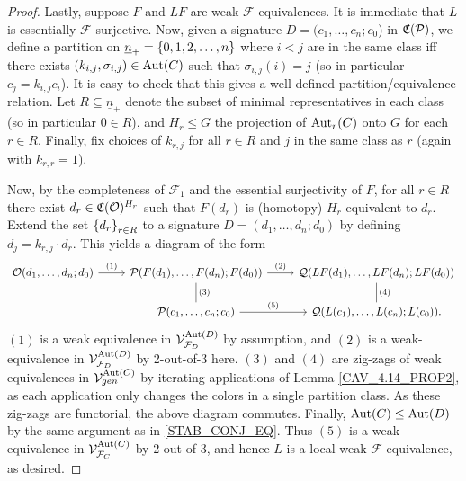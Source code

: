 \documentclass[a4paper,10pt
,draft
]{article}%
\renewcommand{\F}{\mathcal F}
\newcommand{\Q}{\mathcal Q}
\renewcommand{\1}{\eta}%
\begin{document}
\begin{proof}
      Lastly, suppose $F$ and $LF$ are weak $\F$-equivalences.
      It is immediate that $L$ is essentially $\F$-surjective.
      Now, given a signature $D = (c_1,\ldots,c_n;c_0$) in $\mathfrak C(\mathcal{P})$,
      we define a partition on $\underline{n}_+ = \left\{0,1,2,\dots,n\right\}$ where
      $i < j$ are in the same class iff there exists $(k_{i,j}, \sigma_{i,j}) \in \operatorname{Aut}(C)$ such that
      $\sigma_{i,j}(i) = j$ (so in particular $c_j = k_{i,j} c_i$).
      It is easy to check that this gives a well-defined partition/equivalence relation.
      Let $R \subseteq \underline{n}_+$ denote the subset of minimal representatives in each class
      (so in particular $0 \in R$),
      and $H_r \leq G$ the projection of $\operatorname{Aut}_r(C)$ onto $G$ for each $r \in R$.
      Finally, fix choices of $k_{r,j}$ for all $r \in R$ and $j$ in the same class as $r$ (again with $k_{r,r} = 1$).
      
      Now, by the completeness of $\F_1$ and the essential surjectivity of $F$,
      for all $r \in R$ there exist $d_r \in \mathfrak C(\mathcal{O})^{H_r}$ such that
      $F(d_r)$ is (homotopy) $H_r$-equivalent to $d_r$.
      Extend the set $\left\{d_r\right\}_{r\in R}$ to a signature $D = (d_1,\ldots, d_n;d_0)$
      by defining $d_j = k_{r,j} \cdot d_r$.
      This yields a diagram of the form
      \begin{equation}
            \label{TWOOFTHREE_EQ}
            \begin{tikzcd}
                  \O(d_1,\ldots, d_n;d_0) \arrow[r, "(1)"]
                  &
                  \P(F(d_1),\ldots, F(d_n); F(d_0)) \arrow[d,dash, "(3)"] \arrow[r, "(2)"]
                  &
                  \Q(LF(d_1),\ldots, LF(d_n);LF(d_0)) \arrow[d, dash, "(4)"]
                  \\
                  &
                  \P(c_1,\ldots, c_n;c_0) \arrow[r, "(5)"]
                  &
                  \Q(L(c_1),\ldots, L(c_n); L(c_0)).
            \end{tikzcd}
      \end{equation}
      $(1)$ is a weak equivalence in $\V^{\Aut(D)}_{\F_D}$ by assumption, and
      $(2)$ is a weak-equivalence in $\V^{\Aut(D)}_{\F_D}$ by 2-out-of-3 here.
      $(3)$ and $(4)$ are zig-zags of weak equivalences in $\mathcal V^{\operatorname{Aut}(C)}_{gen}$ by iterating applications of
      Lemma \ref{CAV_4.14_PROP2},
      as each application only changes the colors in a single partition class.
      As these zig-zags are functorial, the above diagram commutes.
      Finally, $\operatorname{Aut}(C) \leq \operatorname{Aut}(D)$ by the same argument as in \eqref{STAB_CONJ_EQ}.
      Thus $(5)$ is a weak equivalence in $\V^{\Aut(C)}_{\F_C}$ by 2-out-of-3, and hence
      $L$ is a local weak $\F$-equivalence, as desired.
\end{proof}
\end{document}
